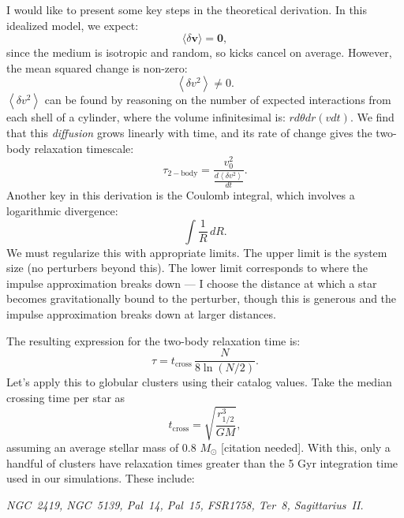             I would like to present some key steps in the theoretical derivation. In this idealized model, we expect:
            \begin{equation}
                \langle \delta \mathbf{v} \rangle = \mathbf{0},
            \end{equation}
            since the medium is isotropic and random, so kicks cancel on average. However, the mean squared change is non-zero:
            \begin{equation}
                \left\langle \delta v^2 \right\rangle \neq 0.
            \end{equation}
            $\left\langle \delta v^2 \right\rangle$ can be found by reasoning on the number of expected interactions from each shell of a cylinder, where the volume infinitesimal is: $rd\theta dr(vdt)$. We find that this \textit{diffusion} grows linearly with time, and its rate of change gives the two-body relaxation timescale:
            \begin{equation}
                \tau_\mathrm{2-body} = \frac{v_0^2}{\frac{d \left\langle \delta v^2 \right\rangle}{dt}}.
            \end{equation}
            Another key in this derivation is the Coulomb integral, which involves a logarithmic divergence:
            \[
            \int \frac{1}{R} \, dR.
            \]
            We must regularize this with appropriate limits. The upper limit is the system size (no perturbers beyond this). The lower limit corresponds to where the impulse approximation breaks down — I choose the distance at which a star becomes gravitationally bound to the perturber, though this is generous and the impulse approximation breaks down at larger distances.

            The resulting expression for the two-body relaxation time is:
            \begin{equation}
                \tau = t_\mathrm{cross} \, \frac{N}{8 \ln(N/2)}.
            \end{equation}
            Let's apply this to globular clusters using their catalog values. Take the median crossing time per star as
            \[
            t_\mathrm{cross} = \sqrt{\frac{r_{1/2}^3}{GM}},
            \]
            assuming an average stellar mass of 0.8 $M_\odot$ [citation needed]. With this, only a handful of clusters have relaxation times greater than the 5 Gyr integration time used in our simulations. These include: 

            \textit{NGC~2419, NGC~5139, Pal~14, Pal~15, FSR1758, Ter~8, Sagittarius~II.}

